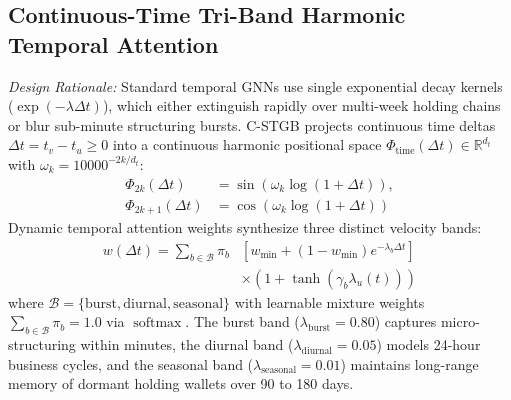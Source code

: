 \subsection{Continuous-Time Tri-Band Harmonic Temporal Attention}
\label{sec:temporal_attention}
\textit{Design Rationale:} Standard temporal GNNs use single exponential decay kernels ($\exp(-\lambda \Delta t)$), which either extinguish rapidly over multi-week holding chains or blur sub-minute structuring bursts. C-STGB projects continuous time deltas $\Delta t = t_v - t_u \ge 0$ into a continuous harmonic positional space $\Phi_{\text{time}}(\Delta t) \in \mathbb{R}^{d_t}$ with $\omega_k = 10000^{-2k/d_t}$:
\begin{align}
\Phi_{2k}(\Delta t) &= \sin\left(\omega_k \log(1 + \Delta t)\right), \\
\Phi_{2k+1}(\Delta t) &= \cos\left(\omega_k \log(1 + \Delta t)\right)
\end{align}
Dynamic temporal attention weights synthesize three distinct velocity bands:
\begin{equation}
\begin{split}
w(\Delta t) = \sum_{b \in \mathcal{B}} \pi_b &\left[ w_{\min} + (1 - w_{\min}) e^{-\lambda_b \Delta t} \right] \\
&\times \left( 1 + \tanh(\gamma_b \lambda_u(t)) \right)
\end{split}
\end{equation}
where $\mathcal{B} = \{\text{burst}, \text{diurnal}, \text{seasonal}\}$ with learnable mixture weights $\sum_{b \in \mathcal{B}} \pi_b = 1.0$ via $\operatorname{softmax}$. The burst band ($\lambda_{\text{burst}} = 0.80$) captures micro-structuring within minutes, the diurnal band ($\lambda_{\text{diurnal}} = 0.05$) models 24-hour business cycles, and the seasonal band ($\lambda_{\text{seasonal}} = 0.01$) maintains long-range memory of dormant holding wallets over 90 to 180 days.

